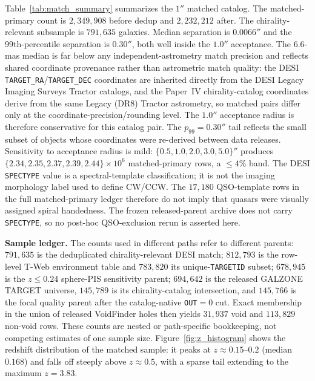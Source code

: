 \documentclass[aps,prd,twocolumn,superscriptaddress,showpacs,preprintnumbers,nofootinbib,longbibliography,floatfix]{revtex4-2}
\begin{document}
Table~\ref{tab:match_summary} summarizes the $1''$ matched catalog.
The matched-primary count is $2{,}349{,}908$ before dedup and
$2{,}232{,}212$ after. The chirality-relevant subsample is $791{,}635$
galaxies. Median separation is $0.0066''$ and the 99th-percentile
separation is $0.30''$, both well inside the $1.0''$ acceptance.
The 6.6-mas median is far below any independent-astrometry match
precision and reflects shared coordinate provenance rather than
astrometric match quality: the DESI \texttt{TARGET\_RA}/\texttt{TARGET\_DEC}
coordinates are inherited directly from the DESI Legacy Imaging Surveys
Tractor catalogs, and the Paper~IV chirality-catalog coordinates derive
from the same Legacy (DR8) Tractor astrometry, so matched pairs differ
only at the coordinate-precision/rounding level. The $1.0''$ acceptance
radius is therefore conservative for this catalog pair. The
$p_{99} = 0.30''$ tail reflects the small subset of objects whose
coordinates were re-derived between data releases.
Sensitivity to acceptance radius is mild: $\{0.5, 1.0, 2.0, 3.0,
5.0\}''$ produces $\{2.34, 2.35, 2.37, 2.39, 2.44\}\!\times\!10^6$
matched-primary rows, a $\le 4\%$ band.
The DESI \texttt{SPECTYPE} value is a spectral-template classification;
it is not the imaging morphology label used to define CW/CCW. The
$17{,}180$ QSO-template rows in the full matched-primary ledger therefore
do not imply that quasars were visually assigned spiral handedness. The
frozen released-parent archive does not carry \texttt{SPECTYPE},
so no post-hoc QSO-exclusion rerun is asserted here.

\textbf{Sample ledger.} The counts used in different paths refer to
different parents: $791{,}635$ is the deduplicated chirality-relevant
DESI match; $812{,}793$ is the row-level T-Web environment table and
$783{,}820$ its unique-\texttt{TARGETID} subset; $678{,}945$ is the
$z\le0.24$ sphere-PIS sensitivity parent; $694{,}642$ is the released
GALZONE TARGET universe, $145{,}789$ is its chirality-catalog intersection,
and $145{,}766$ is the focal quality parent after the catalog-native
\texttt{OUT}$=0$ cut. Exact membership in the union of released VoidFinder
holes then yields $31{,}937$ void and $113{,}829$ non-void rows. These counts are nested or
path-specific bookkeeping, not competing estimates of one sample size.
Figure~\ref{fig:z_histogram} shows the redshift distribution of the
matched sample: it peaks at $z \approx 0.15$--$0.2$ (median $0.168$)
and falls off steeply above $z \approx 0.5$, with a sparse tail
extending to the maximum $z = 3.83$.
\end{document}
